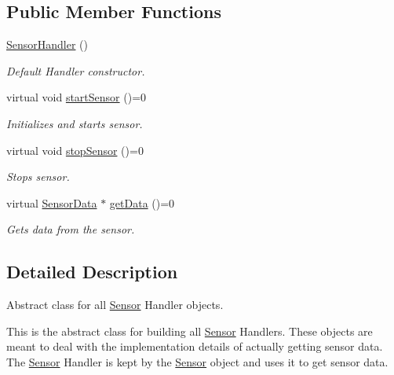 \subsection*{Public Member Functions}
\begin{DoxyCompactItemize}
\item 
\hyperlink{classrlib_1_1SensorHandler_ace170c82c91c36497a1a486979ebba71}{Sensor\-Handler} ()
\begin{DoxyCompactList}\small\item\em Default Handler constructor. \end{DoxyCompactList}\item 
\hypertarget{classrlib_1_1SensorHandler_a48b4756a0838c3c26b2c6d71858c588f}{virtual void \hyperlink{classrlib_1_1SensorHandler_a48b4756a0838c3c26b2c6d71858c588f}{start\-Sensor} ()=0}\label{classrlib_1_1SensorHandler_a48b4756a0838c3c26b2c6d71858c588f}

\begin{DoxyCompactList}\small\item\em Initializes and starts sensor. \end{DoxyCompactList}\item 
\hypertarget{classrlib_1_1SensorHandler_aed535cfe7182f006c9df0f02b0a48dde}{virtual void \hyperlink{classrlib_1_1SensorHandler_aed535cfe7182f006c9df0f02b0a48dde}{stop\-Sensor} ()=0}\label{classrlib_1_1SensorHandler_aed535cfe7182f006c9df0f02b0a48dde}

\begin{DoxyCompactList}\small\item\em Stops sensor. \end{DoxyCompactList}\item 
virtual \hyperlink{classrlib_1_1SensorData}{Sensor\-Data} $\ast$ \hyperlink{classrlib_1_1SensorHandler_a7f9c3e855f436aab794969b3b5cc3193}{get\-Data} ()=0
\begin{DoxyCompactList}\small\item\em Gets data from the sensor. \end{DoxyCompactList}\end{DoxyCompactItemize}


\subsection{Detailed Description}
Abstract class for all \hyperlink{classrlib_1_1Sensor}{Sensor} Handler objects. 

This is the abstract class for building all \hyperlink{classrlib_1_1Sensor}{Sensor} Handlers. These objects are meant to deal with the implementation details of actually getting sensor data. The \hyperlink{classrlib_1_1Sensor}{Sensor} Handler is kept by the \hyperlink{classrlib_1_1Sensor}{Sensor} object and uses it to get sensor data. 

